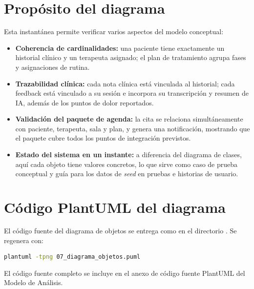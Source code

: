 \section{Propósito del diagrama}

Esta instantánea permite verificar varios aspectos del modelo conceptual:

\begin{itemize}
  \item \textbf{Coherencia de cardinalidades:} una paciente tiene exactamente un historial clínico y un terapeuta asignado; el plan de tratamiento agrupa fases y asignaciones de rutina.
  \item \textbf{Trazabilidad clínica:} cada nota clínica está vinculada al historial; cada feedback está vinculado a su sesión e incorpora su transcripción y resumen de IA, además de los puntos de dolor reportados.
  \item \textbf{Validación del paquete de agenda:} la cita se relaciona simultáneamente con paciente, terapeuta, sala y plan, y genera una notificación, mostrando que el paquete cubre todos los puntos de integración previstos.
  \item \textbf{Estado del sistema en un instante:} a diferencia del diagrama de clases, aquí cada objeto tiene valores concretos, lo que sirve como caso de prueba conceptual y guía para los datos de \textit{seed} en pruebas e historias de usuario.
\end{itemize}

\section{Código PlantUML del diagrama}

El código fuente del diagrama de objetos se entrega como  en el directorio . Se regenera con:

\begin{lstlisting}[language=bash]
plantuml -tpng 07_diagrama_objetos.puml
\end{lstlisting}

El código fuente completo se incluye en el anexo de código fuente PlantUML del Modelo de Análisis.
